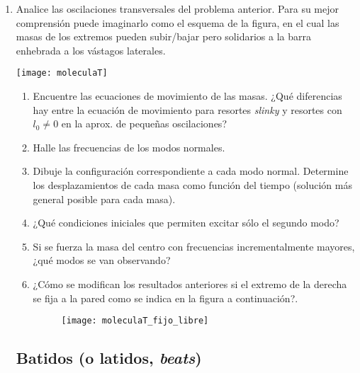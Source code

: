 \documentclass[11pt,spanish,a4paper]{article}
\begin{document}
\begin{enumerate}
\item
\begin{minipage}[t][2.2cm]{0.5\textwidth}
Analice las oscilaciones transversales del problema anterior.
Para su mejor comprensión puede imaginarlo como el esquema de la figura, en el cual las masas de los extremos pueden subir/bajar pero solidarios a la barra enhebrada a los vástagos laterales. 
\end{minipage}
\begin{minipage}[c][0cm][t]{0.45\textwidth}
  \texttt{[image: moleculaT]}
\end{minipage}
\begin{enumerate}
	\item Encuentre las ecuaciones de movimiento de las masas. ¿Qué diferencias hay entre la ecuación de movimiento para resortes \emph{slinky} y resortes con $l_0\ne 0$ en la aprox. de pequeñas oscilaciones?
	\item Halle las frecuencias de los modos normales.
	\item Dibuje la configuración correspondiente a cada modo normal.
Determine los desplazamientos de cada masa como función del tiempo (solución más general posible para cada masa).
	\item ¿Qué condiciones iniciales que permiten excitar sólo el segundo modo?
	\item Si se fuerza la masa del centro con frecuencias incrementalmente mayores, ¿qué modos se van observando?
	\item ¿Cómo se modifican los resultados anteriores si el extremo de la derecha se fija a la pared como se indica en la figura a continuación?.
	\begin{figure}[h]
		\centering{}
		\texttt{[image: moleculaT\_fijo\_libre]}
	\end{figure} 
\end{enumerate}



\subsection*{Batidos (o latidos, \emph{beats})}


\end{enumerate}
\end{document}
